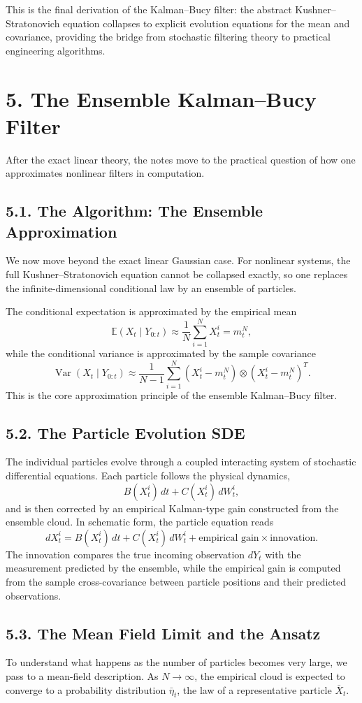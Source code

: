 \documentclass[11pt]{article}
\theoremstyle{definition}
\theoremstyle{remark}
\begin{document}
This is the final derivation of the Kalman--Bucy filter: the abstract Kushner--Stratonovich equation collapses to explicit evolution equations for the mean and covariance, providing the bridge from stochastic filtering theory to practical engineering algorithms.

\section*{5. The Ensemble Kalman--Bucy Filter}
After the exact linear theory, the notes move to the practical question of how one approximates nonlinear filters in computation.

\subsection*{5.1. The Algorithm: The Ensemble Approximation}
We now move beyond the exact linear Gaussian case. For nonlinear systems, the full Kushner--Stratonovich equation cannot be collapsed exactly, so one replaces the infinite-dimensional conditional law by an ensemble of particles.

The conditional expectation is approximated by the empirical mean
\[
\mathbb E(X_t\mid Y_{0:t})
\approx
\frac1N\sum_{i=1}^N X_t^i
=
m_t^N,
\]
while the conditional variance is approximated by the sample covariance
\[
\operatorname{Var}(X_t\mid Y_{0:t})
\approx
\frac{1}{N-1}
\sum_{i=1}^N
(X_t^i-m_t^N)\otimes (X_t^i-m_t^N)^T.
\]
This is the core approximation principle of the ensemble Kalman--Bucy filter.

\subsection*{5.2. The Particle Evolution SDE}
The individual particles evolve through a coupled interacting system of stochastic differential equations. Each particle follows the physical dynamics,
\[
B(X_t^i)\,dt+C(X_t^i)\,dW_t^i,
\]
and is then corrected by an empirical Kalman-type gain constructed from the ensemble cloud. In schematic form, the particle equation reads
\[
dX_t^i
=
B(X_t^i)\,dt
+
C(X_t^i)\,dW_t^i
+
\text{empirical gain}\times \text{innovation}.
\]
The innovation compares the true incoming observation \(dY_t\) with the measurement predicted by the ensemble, while the empirical gain is computed from the sample cross-covariance between particle positions and their predicted observations.

\subsection*{5.3. The Mean Field Limit and the Ansatz}
To understand what happens as the number of particles becomes very large, we pass to a mean-field description. As \(N\to\infty\), the empirical cloud is expected to converge to a probability distribution \(\bar\eta_t\), the law of a representative particle \(\bar X_t\).
\end{document}
